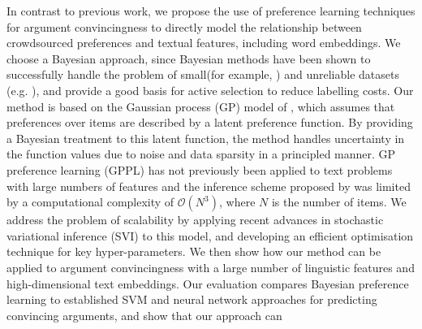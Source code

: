 In contrast to previous work, we propose the use of preference learning techniques for argument convincingness
to directly model the relationship between crowdsourced preferences and textual features, including word embeddings.
We choose a Bayesian approach, since Bayesian methods have been shown to successfully handle the problem of small(for example, \cite{xiong2011bayesian,titov2012bayesian}) and unreliable datasets (e.g. \cite{simpson2015language}),
and provide a good basis for active selection to reduce labelling costs\cite{mackay1992information}.
Our method is based on the Gaussian process (GP) model of \cite{chu2005preference},
which assumes that preferences over items are described by a latent preference function.
By providing a Bayesian treatment to this latent function, the method handles uncertainty
in the function values due to noise and data sparsity in a principled manner.
GP preference learning (GPPL) has not previously been applied to text problems with large
numbers of features and the inference scheme proposed by \cite{chu2005preference}
was limited by a computational complexity of $\mathcal{O}(N^3)$, where $N$ is the number of items.
We address the problem of scalability by applying recent advances in stochastic variational
inference (SVI) \cite{hoffman2013stochastic}  to this model, and
developing an efficient optimisation technique for key hyper-parameters.
We then show how our method can be applied to argument convincingness 
with a large number of linguistic features and high-dimensional text embeddings.
Our evaluation compares Bayesian preference learning to established SVM and neural network approaches for predicting convincing arguments, and show that our approach can
